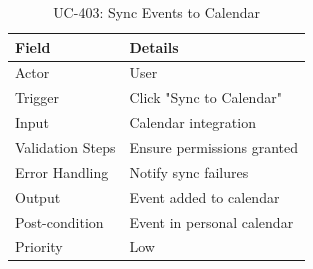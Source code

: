 \begin{table}[H]
\centering
\caption{UC-403: Sync Events to Calendar}
\begin{tabular}{|l|p{10cm}|}
\hline
\textbf{Field} & \textbf{Details} \\ \hline
Actor & User \\ \hline
Trigger & Click "Sync to Calendar" \\ \hline
Input & Calendar integration \\ \hline
Validation Steps & Ensure permissions granted \\ \hline
Error Handling & Notify sync failures \\ \hline
Output & Event added to calendar \\ \hline
Post-condition & Event in personal calendar \\ \hline
Priority & Low \\ \hline
\end{tabular}
\end{table}